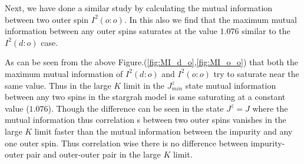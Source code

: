 \documentclass[reprint,prb,superscriptaddress]{revtex4-1}
\begin{document}
Next, we have done a similar study by calculating the mutual information between two outer spin $I^2(o:o)$. In this also we find that the maximum mutual information between any outer spins saturates at the value $1.076$ similar to the $I^2(d:o)$ case.  

\par As can be seen from the above Figure.(\ref{fig:MI_d_o},\ref{fig:MI_o_o}) that  both the maximum mutual information of $I^2(d:o)$ and $I^2(o:o)$ try to saturate near the same value. Thus in the large $K$ limit in the $J^z_{min}$ state mutual information between any two spins in the stargrah model is same saturating at a constant value ($1.076$). Though the difference can be seen in the state $J^z=J$ where the mutual information thus correlation s between two outer spins vanishes in the large $K$ limit faster than the mutual information between the impurity and any one outer spin. Thus correlation wise there is no difference between impurity-outer pair and outer-outer pair in the large $K$ limit.
\end{document}
